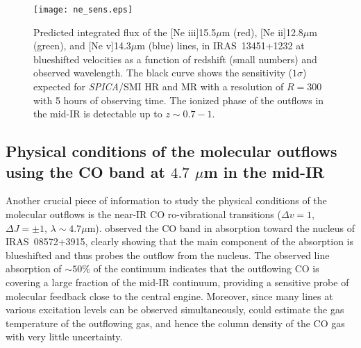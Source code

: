 \documentclass{pasa}%
\newcommand{\kms}{{\hbox {km\thinspace s$^{-1}$}}}
\begin{document}
\begin{figure}
\begin{center}
\texttt{[image: ne\_sens.eps]}
\caption{Predicted integrated flux of the [Ne {\sc iii}]15.5$\mu$m (red), 
[Ne {\sc ii}]12.8$\mu$m (green), and [Ne {\sc v}]14.3$\mu$m (blue) lines, in
IRAS~13451+1232 at blueshifted velocities \citep[from $-3500$ \kms\ to $-500$
  \kms, from][]{spo09} as a function of redshift (small numbers) and observed
wavelength. The black curve shows the sensitivity ($1\sigma$) expected for 
{\it SPICA}/SMI HR and MR with a resolution of $R=300$ with 5 hours of
observing time. The ionized phase of the outflows in the mid-IR is detectable 
up to $z\sim0.7-1$.
} 
\label{ne}
\end{center}
\end{figure}



\subsection{Physical conditions of the molecular outflows using the CO band at
  $4.7$ $\mu$m in the mid-IR} 



Another crucial piece of information to study the physical conditions of the
molecular outflows is the near-IR CO ro-vibrational transitions ($\Delta
v =1$, $\Delta J = \pm 1$, $\lambda \sim 4.7\mu$m). \cite{shi13} observed the
CO band in absorption toward the nucleus of IRAS~08572+3915, clearly showing
that the main component of the absorption is blueshifted and thus probes the
outflow from the nucleus. The observed line absorption of $\sim50$\% of the
continuum indicates that the outflowing CO is covering a large fraction of the
mid-IR continuum, providing a sensitive probe of molecular feedback close to
the central engine. Moreover, since many lines at various excitation 
levels can be observed simultaneously, \cite{shi13} could estimate the gas
temperature of the outflowing gas, and hence the column density of the CO gas
with very little uncertainty.   
\end{document}
